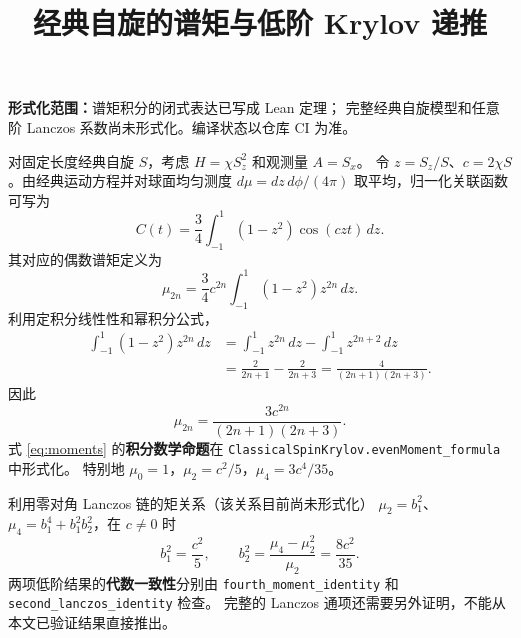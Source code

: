 \documentclass[UTF8,11pt]{ctexart}
\title{经典自旋的谱矩与低阶 Krylov 递推}
\date{}
\begin{document}
\maketitle
\noindent\textbf{形式化范围：}谱矩积分的闭式表达已写成 Lean 定理；
完整经典自旋模型和任意阶 Lanczos 系数尚未形式化。编译状态以仓库 CI 为准。

对固定长度经典自旋 $S$，考虑 $H=\chi S_z^2$ 和观测量 $A=S_x$。
令 $z=S_z/S$、$c=2\chi S$。由经典运动方程并对球面均匀测度
$d\mu=dz\,d\phi/(4\pi)$ 取平均，归一化关联函数可写为
\begin{equation}
 C(t)=\frac34\int_{-1}^1(1-z^2)\cos(czt)\,dz.
 \label{eq:corr}
\end{equation}
其对应的偶数谱矩定义为
\begin{equation}
 \mu_{2n}=\frac34c^{2n}\int_{-1}^1 (1-z^2)z^{2n}\,dz.
\end{equation}
利用定积分线性性和幂积分公式，
\[
 \begin{aligned}
 \int_{-1}^1(1-z^2)z^{2n}\,dz
 &=\int_{-1}^1z^{2n}\,dz-
 \int_{-1}^1z^{2n+2}\,dz\\
 &=\frac2{2n+1}-\frac2{2n+3}
 =\frac4{(2n+1)(2n+3)}.
 \end{aligned}
\]
因此
\begin{equation}
 \boxed{\mu_{2n}=\frac{3c^{2n}}{(2n+1)(2n+3)}}.
 \label{eq:moments}
\end{equation}
式 \eqref{eq:moments} 的\textbf{积分数学命题}在
\texttt{ClassicalSpinKrylov.evenMoment\_formula} 中形式化。
特别地 $\mu_0=1$，$\mu_2=c^2/5$，$\mu_4=3c^4/35$。

利用零对角 Lanczos 链的矩关系（该关系目前尚未形式化）
$\mu_2=b_1^2$、$\mu_4=b_1^4+b_1^2b_2^2$，在 $c\ne0$ 时
\[
 b_1^2=\frac{c^2}{5},\qquad
 b_2^2=\frac{\mu_4-\mu_2^2}{\mu_2}=\frac{8c^2}{35}.
\]
两项低阶结果的\textbf{代数一致性}分别由
\texttt{fourth\_moment\_identity} 和
\texttt{second\_lanczos\_identity} 检查。
完整的 Lanczos 通项还需要另外证明，不能从本文已验证结果直接推出。
\end{document}
